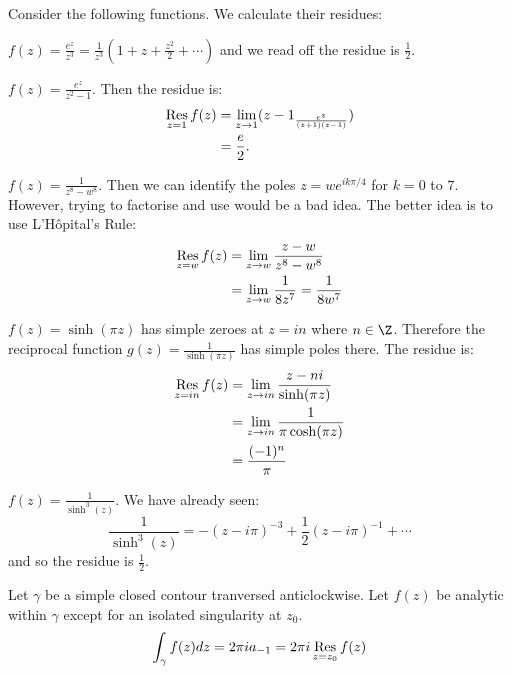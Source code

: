 \documentclass[../Main.tex]{subfiles}
\begin{document}
\begin{examples}{
        Consider the following functions. We calculate their residues:
    }
    \item $f(z) = \frac{e^z}{z^3} = \frac1{z^3} \left(1 + z + \frac{z^2}{2} + \cdots\right)$ and we read off the residue is $\frac12$.
    \item $f(z) = \frac{e^z}{z^2 - 1}$. Then the residue is:
        \begin{align*}
            \operatorname*{Res}_{z = 1} f(z) &= \lim_{z \to 1} (z - 1_ \frac{e^z}{(z + 1)(z - 1)}) \\
            &= \frac{e}{2}.
        \end{align*}
    \item $f(z) = \frac{1}{z^8 - w^8}$. Then we can identify the poles $z = we^{ik\pi / 4}$ for $k = 0$ to $7$. However, trying to factorise and use  would be a bad idea. The better idea is to use L'H\^opital's Rule:
        \begin{align*}
            \operatorname*{Res}_{z = w} f(z) &= \lim_{z \to w} \frac{z-w}{z^8 - w^8} \\
            &= \lim_{z \to w} \frac{1}{8z^7} = \frac{1}{8w^7}
        \end{align*}
    \item $f(z) = \sinh(\pi z)$ has simple zeroes at $z = i n$ where $n \in \Z$. Therefore the reciprocal function $g(z) = \frac{1}{\sinh(\pi z)}$ has simple poles there. The residue is:
        \begin{align*}
            \operatorname*{Res}_{z = i n} f(z) &= \lim_{z \to i n} \frac{z - n i}{\sinh(\pi z)} \\
            &= \lim_{z \to i n} \frac{1}{\pi \cosh(\pi z)} \\
            &= \frac{(-1)^n}{\pi}
        \end{align*}
    \item $f(z) = \frac{1}{\sinh^3(z)}$. We have already seen:
        \begin{equation*}
            \frac{1}{\sinh^3(z)} = -(z - i \pi)^{-3} + \frac12 (z - i \pi)^{-1} + \cdots
        \end{equation*}
        and so the residue is $\frac12$.
\end{examples}
\begin{theorem}
    Let $\gamma$ be a simple closed contour tranversed anticlockwise. Let $f(z)$ be analytic within $\gamma$ except for an isolated singularity at $z_0$.
    \begin{equation}
        \int_{\gamma} f(z) dz = 2\pi i a_{-1} = 2\pi i \operatorname*{Res}_{z = z_0} f(z)
        \label{eqnIntOverSing}
    \end{equation}
    \label{thmResidue}
\end{theorem}
\end{document}
